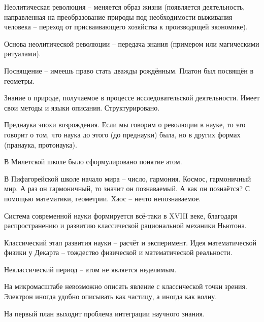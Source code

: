 \documentclass[main.tex]{subfiles}
\begin{document}



Неолитическая революция -- меняется образ жизни (появляется деятельность, направленная на преобразование природы под необходимости выживания человека -- переход от присваивающего хозяйства к производящей экономике).

Основа неолитической революции -- передача знания (примером или магическими ритуалами).

Посвящение -- имеешь право стать дважды рождённым.
Платон был посвящён в геометры.


Знание о природе, получаемое в процессе исследовательской деятельности.
Имеет свои методы и языки описания.
Структурировано.



Преднаука эпохи возрождения.
Если мы говорим о революции в науке, то это говорит о том, что наука до этого (до преднауки) была, но в других формах (пранаука, протонаука).

В Милетской школе было сформулировано понятие атом.

В Пифагорейской школе начало мира -- число, гармония.
Космос, гармоничный мир.
А раз он гармоничный, то значит он познаваемый.
А как он познаётся?
С помощью математики, геометрии.
Хаос -- нечто непознаваемое.



Система современной науки формируется всё-таки в XVIII веке, благодаря распространению и развитию классической рациональной механики Ньютона.

Классический этап развития науки -- расчёт и эксперимент.
Идея математической физики у Декарта -- тождество физической и математической реальности.

Неклассический период -- атом не является неделимым.

На микромасштабе невозможно описать явление с классической точки зрения.
Электрон иногда удобно описывать как частицу, а иногда как волну.


На первый план выходит проблема интеграции научного знания.
\end{document}

